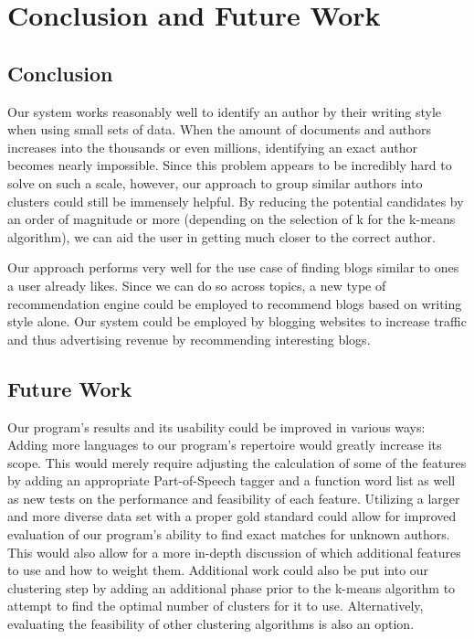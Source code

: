 \section{Conclusion and Future Work}
\label{sec:conclusion}


\subsection{Conclusion}
Our system works reasonably well to identify an author by their writing style when using small sets of data.
When the amount of documents and authors increases into the thousands or even millions, identifying an exact author becomes nearly impossible.
Since this problem appears to be incredibly hard to solve on such a scale, however, our approach to group similar authors into clusters could still be immensely helpful.
By reducing the potential candidates by an order of magnitude or more (depending on the selection of k for the k-means algorithm), we can aid the user in getting much closer to the correct author.

Our approach performs very well for the use case of finding blogs similar to ones a user already likes.
Since we can do so across topics, a new type of recommendation engine could be employed to recommend blogs based on writing style alone.
Our system could be employed by blogging websites to increase traffic and thus advertising revenue by recommending interesting blogs.


\subsection{Future Work}
Our program’s results and its usability could be improved in various ways: Adding more languages to our program’s repertoire would greatly increase its scope.
This would merely require adjusting the calculation of some of the features by adding an appropriate Part-of-Speech tagger and a function word list as well as new tests on the performance and feasibility of each feature.
Utilizing a larger and more diverse data set with a proper gold standard could allow for improved evaluation of our program’s ability to find exact matches for unknown authors.
This would also allow for a more in-depth discussion of which additional features to use and how to weight them.
Additional work could also be put into our clustering step by adding an additional phase prior to the k-means algorithm to attempt to find the optimal number of clusters for it to use.
Alternatively, evaluating the feasibility of other clustering algorithms is also an option.